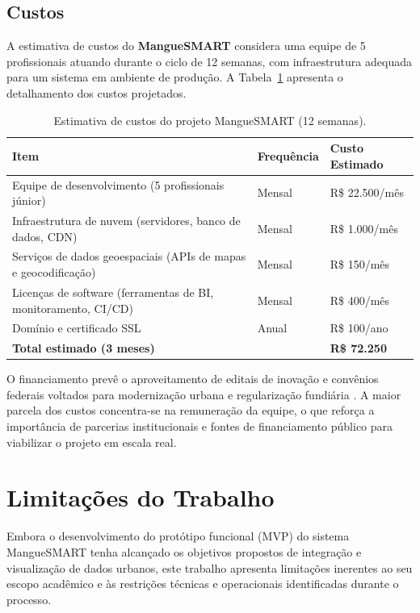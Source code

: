 \documentclass[12pt]{article}
\begin{document}
\subsection{Custos}

A estimativa de custos do \textbf{MangueSMART} considera uma equipe de 5 profissionais atuando durante o ciclo de 12 semanas, com infraestrutura adequada para um sistema em ambiente de produção. A Tabela~\ref{tab:custos} apresenta o detalhamento dos custos projetados.

\begin{table}[H]
\centering
\caption{Estimativa de custos do projeto MangueSMART (12 semanas).}
\label{tab:custos}
\begin{tabular}{@{}p{5.5cm} p{2.5cm} p{3.5cm}@{}}
\toprule
\textbf{Item} & \textbf{Frequência} & \textbf{Custo Estimado} \\
\midrule
Equipe de desenvolvimento (5 profissionais júnior) & Mensal & R\$ 22.500/mês \\
Infraestrutura de nuvem (servidores, banco de dados, CDN) & Mensal & R\$ 1.000/mês \\
Serviços de dados geoespaciais (APIs de mapas e geocodificação) & Mensal & R\$ 150/mês \\
Licenças de software (ferramentas de BI, monitoramento, CI/CD) & Mensal & R\$ 400/mês \\
Domínio e certificado SSL & Anual & R\$ 100/ano \\
\midrule
\textbf{Total estimado (3 meses)} & & \textbf{R\$ 72.250} \\
\bottomrule
\end{tabular}
\end{table}

O financiamento prevê o aproveitamento de editais de inovação e convênios federais voltados para modernização urbana e regularização fundiária \cite{agenciagov2025}. A maior parcela dos custos concentra-se na remuneração da equipe, o que reforça a importância de parcerias institucionais e fontes de financiamento público para viabilizar o projeto em escala real.


\section{Limitações do Trabalho} \label{sec:ameacas}

Embora o desenvolvimento do protótipo funcional (MVP) do sistema MangueSMART tenha alcançado os objetivos propostos de integração e visualização de dados urbanos, este trabalho apresenta limitações inerentes ao seu escopo acadêmico e às restrições técnicas e operacionais identificadas durante o processo.
\end{document}
